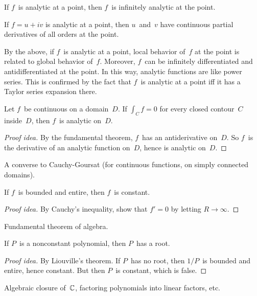 \begin{cor}
If \(f\)~is analytic at a point, then \(f\)~is infinitely analytic at the point.
\end{cor}

\begin{cor}
If \(f=u+iv\) is analytic at a point, then \(u\)~and~\(v\) have continuous partial derivatives of all orders at the point.
\end{cor}

\begin{rmk}
By the above, if \(f\)~is analytic at a point, local behavior of~\(f\) at the point is related to global behavior of~\(f\). Moreover, \(f\)~can be infinitely differentiated and antidifferentiated at the point. In this way, analytic functions are like power series. This is confirmed by the fact that \(f\)~is analytic at a point iff it has a Taylor series expansion there.
\end{rmk}

\begin{thm}[Morera]
Let \(f\)~be continuous on a domain~\(D\). If \(\int_C f=0\) for every closed contour~\(C\) inside~\(D\), then \(f\)~is analytic on~\(D\).
\end{thm}
\begin{proof}[Proof idea]
By the fundamental theorem, \(f\)~has an antiderivative on~\(D\). So \(f\)~is the derivative of an analytic function on~\(D\), hence is analytic on~\(D\).
\end{proof}
\begin{app}
A converse to Cauchy-Goursat (for continuous functions, on simply connected domains).
\end{app}

\begin{thm}[Liouville]
If \(f\)~is bounded and entire, then \(f\)~is constant.
\end{thm}
\begin{proof}[Proof idea]
By Cauchy's inequality, show that \(f'=0\) by letting \(R\to\infty\).
\end{proof}
\begin{app}
Fundamental theorem of algebra.
\end{app}

\begin{thm}
If \(P\)~is a nonconstant polynomial, then \(P\)~has a root.
\end{thm}
\begin{proof}[Proof idea]
By Liouville's theorem. If \(P\)~has no root, then \(1/P\)~is bounded and entire, hence constant. But then \(P\)~is constant, which is false.
\end{proof}
\begin{app}
Algebraic closure of~\(\mathbb{C}\), factoring polynomials into linear factors, etc.
\end{app}


